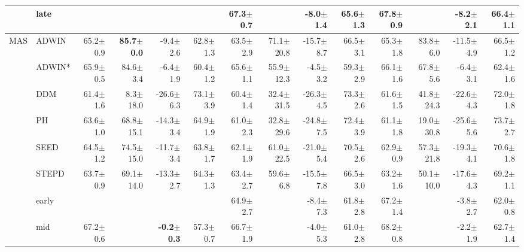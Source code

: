 \begin{tabular}{llrrrrrrrrrrrr}
 & late &  &  &  &  & 67.3\tiny{$\pm$0.7} &  & -8.0\tiny{$\pm$1.4} & 65.6\tiny{$\pm$1.3} & 67.8\tiny{$\pm$0.9} &  & -8.2\tiny{$\pm$2.1} & 66.4\tiny{$\pm$1.1} \\
\midrule
\multirow[t]{9}{*}{MAS} & ADWIN & 65.2\tiny{$\pm$0.9} & \textbf{85.7\tiny{$\pm$0.0}} & -9.4\tiny{$\pm$2.6} & 62.8\tiny{$\pm$1.3} & 63.5\tiny{$\pm$2.9} & 71.1\tiny{$\pm$20.8} & -15.7\tiny{$\pm$8.7} & 66.5\tiny{$\pm$3.1} & 65.3\tiny{$\pm$1.8} & 83.8\tiny{$\pm$6.0} & -11.5\tiny{$\pm$4.9} & 66.5\tiny{$\pm$1.2} \\
 & ADWIN* & 65.9\tiny{$\pm$0.5} & 84.6\tiny{$\pm$3.4} & -6.4\tiny{$\pm$1.9} & 60.4\tiny{$\pm$1.2} & 65.6\tiny{$\pm$1.1} & 55.9\tiny{$\pm$12.3} & -4.5\tiny{$\pm$3.2} & 59.3\tiny{$\pm$2.9} & 66.1\tiny{$\pm$1.6} & 67.8\tiny{$\pm$5.6} & -6.4\tiny{$\pm$3.1} & 62.4\tiny{$\pm$1.6} \\
 & DDM & 61.4\tiny{$\pm$1.6} & 8.3\tiny{$\pm$18.0} & -26.6\tiny{$\pm$6.3} & 73.1\tiny{$\pm$3.9} & 60.4\tiny{$\pm$1.4} & 32.4\tiny{$\pm$31.5} & -26.3\tiny{$\pm$4.5} & 73.3\tiny{$\pm$2.6} & 61.6\tiny{$\pm$1.5} & 41.8\tiny{$\pm$24.3} & -22.6\tiny{$\pm$4.3} & 72.0\tiny{$\pm$1.8} \\
 & PH & 63.6\tiny{$\pm$1.0} & 68.8\tiny{$\pm$15.1} & -14.3\tiny{$\pm$3.4} & 64.9\tiny{$\pm$1.9} & 61.0\tiny{$\pm$2.3} & 32.8\tiny{$\pm$29.6} & -24.8\tiny{$\pm$7.5} & 72.4\tiny{$\pm$3.9} & 61.1\tiny{$\pm$1.8} & 19.0\tiny{$\pm$30.8} & -25.6\tiny{$\pm$5.6} & 73.7\tiny{$\pm$2.7} \\
 & SEED & 64.5\tiny{$\pm$1.2} & 74.5\tiny{$\pm$15.0} & -11.7\tiny{$\pm$3.4} & 63.8\tiny{$\pm$1.7} & 62.1\tiny{$\pm$1.9} & 61.0\tiny{$\pm$22.5} & -21.0\tiny{$\pm$5.4} & 70.5\tiny{$\pm$2.6} & 62.9\tiny{$\pm$0.9} & 57.3\tiny{$\pm$21.8} & -19.3\tiny{$\pm$4.1} & 70.6\tiny{$\pm$1.8} \\
 & STEPD & 63.7\tiny{$\pm$0.9} & 69.1\tiny{$\pm$14.0} & -13.3\tiny{$\pm$2.7} & 64.3\tiny{$\pm$1.3} & 63.4\tiny{$\pm$2.7} & 59.6\tiny{$\pm$6.8} & -15.5\tiny{$\pm$7.8} & 66.5\tiny{$\pm$3.0} & 63.2\tiny{$\pm$1.6} & 50.1\tiny{$\pm$10.0} & -17.6\tiny{$\pm$4.3} & 69.2\tiny{$\pm$1.1} \\
 & early &  &  &  &  & 64.9\tiny{$\pm$2.7} &  & -8.4\tiny{$\pm$7.3} & 61.8\tiny{$\pm$2.8} & 67.2\tiny{$\pm$1.4} &  & -3.8\tiny{$\pm$2.7} & 62.0\tiny{$\pm$0.8} \\
 & mid & 67.2\tiny{$\pm$0.6} &  & \textbf{-0.2\tiny{$\pm$0.3}} & 57.3\tiny{$\pm$0.7} & 66.7\tiny{$\pm$1.9} &  & -4.0\tiny{$\pm$5.3} & 61.0\tiny{$\pm$2.8} & 68.2\tiny{$\pm$0.8} &  & -2.2\tiny{$\pm$1.9} & 62.7\tiny{$\pm$1.4} \\

\end{tabular}
